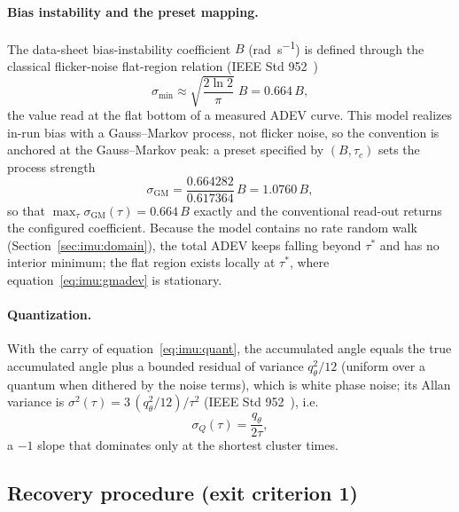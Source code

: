 \paragraph{Bias instability and the preset mapping.} The data-sheet
bias-instability coefficient $B$ (\unit{\radian\per\second}) is defined
through the classical flicker-noise flat-region relation
(IEEE Std 952~\cite{ieee952})
\begin{equation}
  \sigma_{\min} \approx \sqrt{\frac{2\ln 2}{\pi}}\; B = 0.664\,B ,
  \label{eq:imu:bi}
\end{equation}
the value read at the flat bottom of a measured ADEV curve. This model
realizes in-run bias with a Gauss--Markov process, not flicker noise, so
the convention is anchored at the Gauss--Markov peak: a preset specified
by $(B, \tau_c)$ sets the process strength
\begin{equation}
  \boxed{\;
  \sigma_{\mathrm{GM}} = \frac{0.664282}{0.617364}\, B = 1.0760\, B ,
  \;}
  \label{eq:imu:presetmap}
\end{equation}
so that $\max_\tau \sigma_{\mathrm{GM}}(\tau) = 0.664\,B$ exactly and the
conventional read-out returns the configured coefficient. Because the
model contains no rate random walk
(Section~\ref{sec:imu:domain}), the total ADEV keeps falling beyond
$\tau^{*}$ and has no interior minimum; the flat region exists locally at
$\tau^{*}$, where equation~\eqref{eq:imu:gmadev} is stationary.

\paragraph{Quantization.} With the carry of
equation~\eqref{eq:imu:quant}, the accumulated angle equals the true
accumulated angle plus a bounded residual of variance $q_\theta^2/12$
(uniform over a quantum when dithered by the noise terms), which is white
phase noise; its Allan variance is $\sigma^2(\tau) = 3\,(q_\theta^2/12)/
\tau^2$ (IEEE Std 952~\cite{ieee952}), i.e.
\begin{equation}
  \sigma_{Q}(\tau) = \frac{q_\theta}{2\tau},
  \label{eq:imu:quantadev}
\end{equation}
a $-1$ slope that dominates only at the shortest cluster times.

\subsection{Recovery procedure (exit criterion 1)}
\label{sec:imu:recovery}

